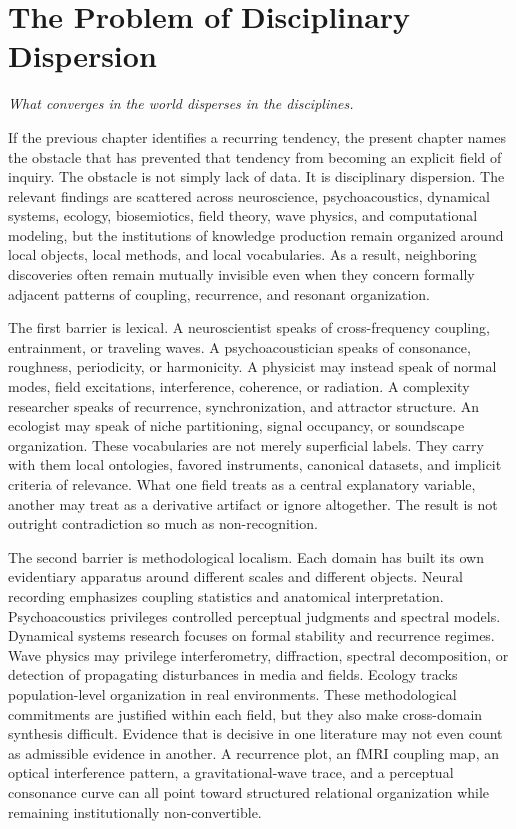 \chapter{The Problem of Disciplinary Dispersion}

\epigraph{\emph{What converges in the world disperses in the disciplines.}}{}

If the previous chapter identifies a recurring tendency, the present chapter names the obstacle that has prevented that tendency from becoming an explicit field of inquiry. The obstacle is not simply lack of data. It is disciplinary dispersion. The relevant findings are scattered across neuroscience, psychoacoustics, dynamical systems, ecology, biosemiotics, field theory, wave physics, and computational modeling, but the institutions of knowledge production remain organized around local objects, local methods, and local vocabularies. As a result, neighboring discoveries often remain mutually invisible even when they concern formally adjacent patterns of coupling, recurrence, and resonant organization.

The first barrier is lexical. A neuroscientist speaks of cross-frequency coupling, entrainment, or traveling waves. A psychoacoustician speaks of consonance, roughness, periodicity, or harmonicity. A physicist may instead speak of normal modes, field excitations, interference, coherence, or radiation. A complexity researcher speaks of recurrence, synchronization, and attractor structure. An ecologist may speak of niche partitioning, signal occupancy, or soundscape organization. These vocabularies are not merely superficial labels. They carry with them local ontologies, favored instruments, canonical datasets, and implicit criteria of relevance. What one field treats as a central explanatory variable, another may treat as a derivative artifact or ignore altogether. The result is not outright contradiction so much as non-recognition.

The second barrier is methodological localism. Each domain has built its own evidentiary apparatus around different scales and different objects. Neural recording emphasizes coupling statistics and anatomical interpretation. Psychoacoustics privileges controlled perceptual judgments and spectral models. Dynamical systems research focuses on formal stability and recurrence regimes. Wave physics may privilege interferometry, diffraction, spectral decomposition, or detection of propagating disturbances in media and fields. Ecology tracks population-level organization in real environments. These methodological commitments are justified within each field, but they also make cross-domain synthesis difficult. Evidence that is decisive in one literature may not even count as admissible evidence in another. A recurrence plot, an fMRI coupling map, an optical interference pattern, a gravitational-wave trace, and a perceptual consonance curve can all point toward structured relational organization while remaining institutionally non-convertible.


